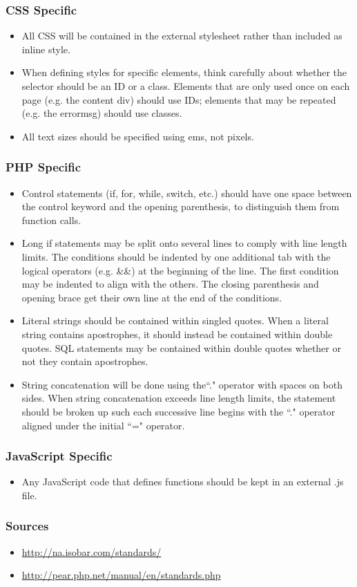 		\subsubsection{CSS Specific}
		\begin{itemize}
			\item All CSS will be contained in the external stylesheet rather than included as inline style.
			\item When defining styles for specific elements, think carefully about whether the selector should be an ID or a class. Elements that are only used once on each page (e.g. the content div) should use IDs; elements that may be repeated (e.g. the errormsg) should use classes.
			\item All text sizes should be specified using ems, not pixels.
		\end{itemize}
			
		\subsubsection{PHP Specific}
		\begin{itemize}
			\item Control statements (if, for, while, switch, etc.) should have one space between the control keyword and the opening parenthesis, to distinguish them from function calls.
			\item Long if statements may be split onto several lines to comply with line length limits. The conditions should be indented by one additional tab with the logical operators (e.g. \&\&) at the beginning of the line. The first condition may be indented to align with the others. The closing parenthesis and opening brace get their own line at the end of the conditions.
			\item Literal strings should be contained within singled quotes. When a literal string contains apostrophes, it should instead be contained within double quotes. SQL statements may be contained within double quotes whether or not they contain apostrophes.
			\item String concatenation will be done using the``." operator with spaces on both sides. When string concatenation exceeds line length limits, the statement should be broken up such each successive line begins with the ``." operator aligned under the initial ``=" operator.
		\end{itemize}
			
		\subsubsection{JavaScript Specific}
		\begin{itemize}
			\item Any JavaScript code that defines functions should be kept in an external .js file.
		\end{itemize}
			
		\subsubsection{Sources}
		\begin{itemize}
			\item \url{http://na.isobar.com/standards/}
			\item \url{http://pear.php.net/manual/en/standards.php}
		\end{itemize}

